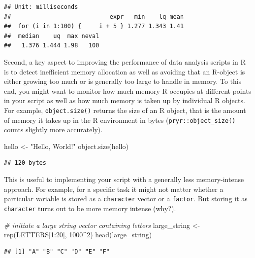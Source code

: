 \documentclass[
  12pt,
]{style/krantz}
\newenvironment{Shaded}{\begin{snugshade}}{\end{snugshade}}
\newcommand{\CommentTok}[1]{\textcolor[rgb]{0.56,0.35,0.01}{\textit{#1}}}
\newcommand{\DecValTok}[1]{\textcolor[rgb]{0.00,0.00,0.81}{#1}}
\newcommand{\FunctionTok}[1]{\textcolor[rgb]{0.00,0.00,0.00}{#1}}
\newcommand{\NormalTok}[1]{#1}
\newcommand{\OtherTok}[1]{\textcolor[rgb]{0.56,0.35,0.01}{#1}}
\newcommand{\SpecialCharTok}[1]{\textcolor[rgb]{0.00,0.00,0.00}{#1}}
\newcommand{\StringTok}[1]{\textcolor[rgb]{0.31,0.60,0.02}{#1}}
\begin{document}
\begin{verbatim}
## Unit: milliseconds
##                            expr   min    lq mean
##  for (i in 1:100) {     i + 5 } 1.277 1.343 1.41
##  median    uq  max neval
##   1.376 1.444 1.98   100
\end{verbatim}

Second, a key aspect to improving the performance of data analysis scripts in R is to detect inefficient memory allocation as well as avoiding that an R-object is either growing too much or is generally too large to handle in memory. To this end, you might want to monitor how much memory R occupies at different points in your script as well as how much memory is taken up by individual R objects. For example, \texttt{object.size()} returns the size of an R object, that is the amount of memory it takes up in the R environment in bytes (\texttt{pryr::object\_size()} counts slightly more accurately).

\begin{Shaded}
\begin{Highlighting}[]
\NormalTok{hello }\OtherTok{\textless{}{-}} \StringTok{"Hello, World!"}
\FunctionTok{object.size}\NormalTok{(hello)}
\end{Highlighting}
\end{Shaded}

\begin{verbatim}
## 120 bytes
\end{verbatim}

This is useful to implementing your script with a generally less memory-intense approach. For example, for a specific task it might not matter whether a particular variable is stored as a \texttt{character} vector or a \texttt{factor}. But storing it as \texttt{character} turns out to be more memory intense (why?).

\begin{Shaded}
\begin{Highlighting}[]
\CommentTok{\# initiate a large string vector containing letters}
\NormalTok{large\_string }\OtherTok{\textless{}{-}} \FunctionTok{rep}\NormalTok{(LETTERS[}\DecValTok{1}\SpecialCharTok{:}\DecValTok{20}\NormalTok{], }\DecValTok{1000}\SpecialCharTok{\^{}}\DecValTok{2}\NormalTok{)}
\FunctionTok{head}\NormalTok{(large\_string)}
\end{Highlighting}
\end{Shaded}

\begin{verbatim}
## [1] "A" "B" "C" "D" "E" "F"
\end{verbatim}
\end{document}

